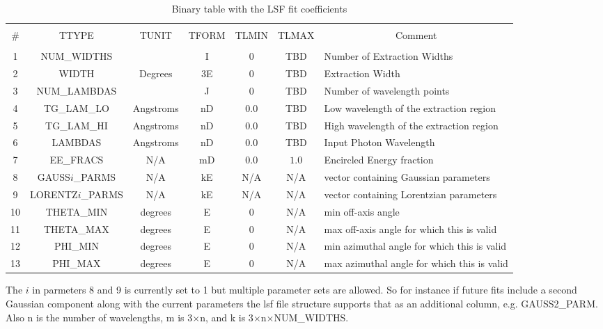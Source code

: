 \documentclass[twoside]{article}
\begin{document}
\begin{table}[h]
\begin{center}
{\small
\begin{tabular}{|c|c|c|c|c|c|p{1.8in}|}
\hline
 & & & & & & \\
 \#
 & TTYPE
 & TUNIT
 & TFORM 
 & TLMIN
 & TLMAX
 & \multicolumn{1}{|c|}{Comment}\\
 & & & & & & \\\hline
%
 1
 & NUM\_WIDTHS
 & 
 & I
 & 0
 & \sc TBD
 & Number of Extraction Widths \\\hline
%
 2
 & WIDTH
 & Degrees
 & 3E
 & 0
 & \sc TBD
 & Extraction Width \\\hline
%
 3
 & NUM\_LAMBDAS
 & 
 & J
 & 0
 & \sc TBD
 & Number of wavelength points \\\hline
%
 4
 & TG\_LAM\_LO
 & Angstroms
 & nD
 & $0.0$
 & \sc TBD
 & Low wavelength of the extraction region\\\hline
%
 5
 & TG\_LAM\_HI
 & Angstroms
 & nD
 & $0.0$
 & \sc TBD
 & High wavelength of the extraction region\\\hline
%
 6
 & LAMBDAS
 & Angstroms
 & nD
 & $0.0$
 & \sc TBD
 & Input Photon Wavelength \\\hline
%
 7
 & EE\_FRACS
 & N/A
 & mD
 & $0.0$
 & $1.0$
 & Encircled Energy fraction\\\hline
%
 8
 & GAUSS$i$\_PARMS
 & N/A
 & kE
 & N/A
 & N/A
 & vector containing Gaussian parameters\\\hline
%
 9
 & LORENTZ$i$\_PARMS
 & N/A
 & kE
 & N/A
 & N/A
 & vector containing Lorentzian parameters\\\hline
%
 10
 & THETA\_MIN
 & degrees
 & E
 & 0
 & N/A
 & min off-axis angle\\\hline
%
 11
 & THETA\_MAX
 & degrees
 & E
 & 0
 & N/A
 & max off-axis angle for which this is valid\\\hline
%
 12
 & PHI\_MIN
 & degrees
 & E
 & 0
 & N/A
 & min azimuthal angle for which this is valid\\\hline
%
 13
 & PHI\_MAX
 & degrees
 & E
 & 0
 & N/A
 & max azimuthal angle for which this is valid\\\hline
%
%
\end{tabular}
}%
\caption{Binary table with the LSF fit coefficients}
\label{tab:parms}
\end{center}
\end{table}%
The $i$ in parmeters 8 and 9 is currently set to 1 but multiple parameter 
sets are allowed. So for instance if future fits include a second
Gaussian component along with the current parameters the lsf file 
structure supports that as an additional column, e.g. GAUSS2\_PARM. 
Also n is the number of wavelengths, m is 3$\times$n, and k is 
3$\times$n$\times$NUM\_WIDTHS. 
%
\end{document}
